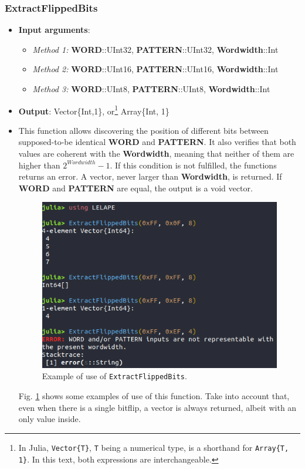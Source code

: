  \subsubsection*{ExtractFlippedBits}\label{Func:ExtractFlippedBits}
 \begin {itemize}
 \item \textbf{Input arguments}:
 \begin{itemize}
 	\item \textit{Method 1: }\textbf{WORD}::UInt32, \textbf{PATTERN}::UInt32, \textbf{Wordwidth}::Int
 	\item \textit{Method 2: }\textbf{WORD}::UInt16, \textbf{PATTERN}::UInt16, \textbf{Wordwidth}::Int
 	\item \textit{Method 3: }\textbf{WORD}::UInt8, \textbf{PATTERN}::UInt8, \textbf{Wordwidth}::Int
 \end{itemize}
 \item \textbf{Output}: Vector\{Int,1\}, or\footnote{In Julia, \texttt{Vector\{T\}}, \texttt{T} being a numerical type, is a shorthand for \texttt{Array\{T, 1\}}. In this text, both expressions are interchangeable.} Array\{Int, 1\}
 \item This function allows discovering the position of different bits between supposed-to-be identical \textbf{WORD}
 and \textbf{PATTERN}. It also verifies that both values are coherent with the \textbf{Wordwidth},
 meaning that neither of them are higher than \(2^{Wordwidth}-1\). If this condition is not fulfilled, the functions returns an error. A vector, never larger than \textbf{Wordwidth}, is returned. If \textbf{WORD} and \textbf{PATTERN} are equal, the output is a void vector.
 \begin{figure}[h!]
 	\centering
 	\includegraphics[width=0.65\columnwidth]{fig/functions/ExtractFlippedBits.png}
 	\caption{Example of use of \texttt{ExtractFlippedBits}.}
 	\label{fig:Example_ExtractFlippedBits}
 \end{figure}
 
 Fig. \ref{fig:Example_ExtractFlippedBits} shows some examples of use of this function. Take into account that, even when there is a single bitflip, a vector is always returned, albeit with an only value inside.
\end{itemize}
%
%
%
